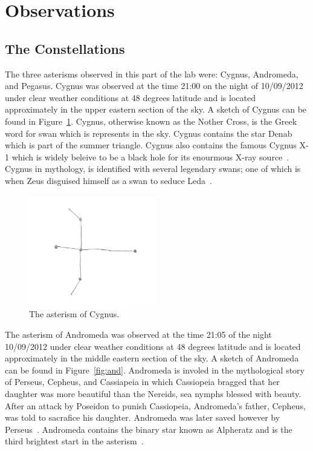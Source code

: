 \documentclass{article}
\begin{document}
\section{Observations}

\subsection{The Constellations}
The three asterisms observed in this part of the lab were: Cygnus, Andromeda, and Pegasus. Cygnus was observed at the time
21:00 on the night of 10/09/2012 under clear weather conditions at 48 degrees latitude and is located approximately in
the upper eastern section of the sky. A sketch of Cygnus can be found in
Figure~\ref{fig:cygnus}. Cygnus, otherwise known as the Nother Cross, is the Greek word for swan which is represents in the sky.
Cygnus contains the star Denab which is part of the summer triangle. Cygnus also contains the famous Cygnus X-1 which is widely
beleive to be a black hole for its enourmous X-ray source~\cite{ESA:2012}. Cygnus in mythology, is identified with several legendary
swans; one of which is when Zeus disguised himself as a swan to seduce Leda~\cite{Tirion:2001}.

\begin{figure}[h]
\centering
\includegraphics[width=0.5\textwidth]{images/cygnus}
\caption{The asterism of Cygnus.\label{fig:cygnus}}
\end{figure}

The asterism of Andromeda was observed at the time 21:05 of the night 10/09/2012 under clear weather conditions at 48 degrees
latitude and is located approximately in the middle eastern section of the sky. A sketch of Andromeda can be found in Figure~\ref{fig:and}.
Andromeda is involed in the mythological story of Perseus, Cepheus, and Cassiapeia in which Cassiopeia bragged that her daughter
was more beautiful than the Nereids, sea nymphs blessed with beauty. After an attack by Poseidon to punish Cassiopeia, Andromeda's
father, Cepheus, was told to sacrafice his daughter. Andromeda was later saved however by Perseus~\cite{Thompson:2007}. Andromeda
contains the binary star known as Alpheratz and is the third brightest start in the asterism~\cite{Moore:2000}.
\end{document}
